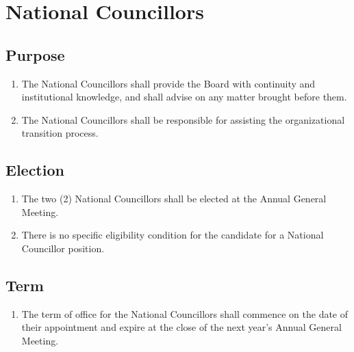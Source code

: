 \section{National Councillors}
\label{national-councillors}

\subsection{Purpose}
\label{national-councillors-purpose}

\begin{enumerate}
 \item The National Councillors shall provide the Board with continuity and institutional knowledge, and shall advise on any matter brought before them.
 \item The National Councillors shall be responsible for assisting the organizational transition process.
\end{enumerate}

\subsection{Election}
\label{national-councillors-election}

\begin{enumerate}
 \item The two (2) National Councillors shall be elected at the Annual General Meeting.
 \item There is no specific eligibility condition for the candidate for a National Councillor position.
\end{enumerate}

\subsection{Term}
\label{national-councillors-term}

\begin{enumerate}
 \item The term of office for the National Councillors shall commence on the date of their appointment and expire at the close of the next year’s Annual General Meeting.
\end{enumerate}
